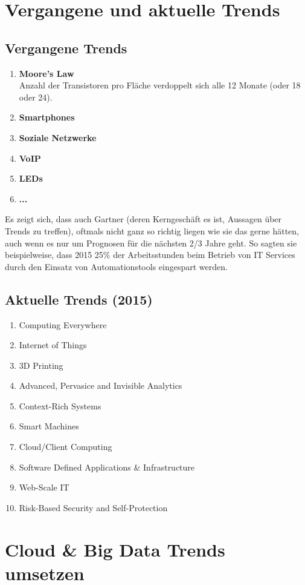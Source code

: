 \section{Vergangene und aktuelle Trends}
\subsection{Vergangene Trends}
\begin{enumerate}
	\item \textbf{Moore's Law} \\
		Anzahl der Transistoren pro Fläche verdoppelt sich alle 12 Monate (oder 18 oder 24).
	\item \textbf{Smartphones}
	\item \textbf{Soziale Netzwerke}
	\item \textbf{VoIP}
	\item \textbf{LEDs}
	\item \textbf{...}
\end{enumerate}
Es zeigt sich, dass auch Gartner (deren Kerngeschäft es ist, Aussagen über Trends zu treffen), oftmals nicht ganz so richtig liegen wie sie das gerne hätten, auch wenn es nur um Prognosen für die nächsten 2/3 Jahre geht. So sagten sie beispielweise, dass 2015 25\% der Arbeitsstunden beim Betrieb von IT Services durch den Einsatz von Automationstools eingespart werden.
\subsection{Aktuelle Trends (2015)}
\begin{enumerate}
	\item Computing Everywhere
	\item Internet of Things
	\item 3D Printing
	\item Advanced, Pervasice and Invisible Analytics
	\item Context-Rich Systems
	\item Smart Machines
	\item Cloud/Client Computing
	\item Software Defined Applications \& Infrastructure
	\item Web-Scale IT
	\item Risk-Based Security and Self-Protection
\end{enumerate}

\section{Cloud \& Big Data Trends umsetzen}
